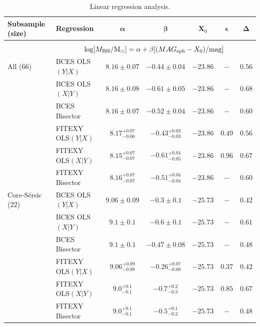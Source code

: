 \documentclass[preprint2]{emulateapj}
\begin{document}
\begin{table}
\centering
\caption{Linear regression analysis.}
\begin{tabular}{llccccc}
\hline
\hline
{\bf Subsample (size)} & {\bf Regression} & $\boldsymbol \alpha$ & $\boldsymbol \beta$ & $\boldsymbol X_0$ & $\boldsymbol \epsilon$ & $\boldsymbol \Delta$ \\ 
\hline 
\\
 & \multicolumn{6}{c}{$\log[M_{\rm BH}/{\rm M_\odot}] = \alpha + \beta[(MAG_{\rm sph} - X_0)/{\rm mag}]$} \\ [0.5em]
All (66)	       & BCES OLS$(Y|X)$   & $8.16 \pm 0.07$ & $-0.44 \pm 0.04$ & $-23.86$ & $-$ & $0.56$ \\
		       & BCES OLS$(X|Y)$   & $8.16 \pm 0.08$ & $-0.61 \pm 0.05$ & $-23.86$ & $-$ & $0.68$ \\
		       & BCES Bisector     & $8.16 \pm 0.07$ & $-0.52 \pm 0.04$ & $-23.86$ & $-$ & $0.60$ \\
		       & FITEXY OLS$(Y|X)$ & $8.17^{+0.07}_{-0.06}$ & $-0.43^{+0.03}_{-0.03}$ & $-23.86$ & $0.49$ & $0.56$ \\
		       & FITEXY OLS$(X|Y)$ & $8.15^{+0.07}_{-0.07}$ & $-0.61^{+0.04}_{-0.05}$ & $-23.86$ & $0.96$ & $0.67$ \\
		       & FITEXY Bisector   & $8.16^{+0.07}_{-0.07}$ & $-0.51^{+0.04}_{-0.04}$ & $-23.86$ & $-$    & $0.60$ \\

Core-S\'ersic (22) & BCES OLS$(Y|X)$   & $9.06 \pm 0.09$ & $-0.3  \pm 0.1$  & $-25.73$ & $-$    & $0.42$ \\ 
                   & BCES OLS$(X|Y)$   & $9.1  \pm 0.1$  & $-0.6  \pm 0.1$  & $-25.73$ & $-$    & $0.61$ \\
                   & BCES Bisector     & $9.1  \pm 0.1$  & $-0.47 \pm 0.08$ & $-25.73$ & $-$    & $0.48$ \\
                   & FITEXY OLS$(Y|X)$ & $9.06^{+0.09}_{-0.08}$ & $-0.26^{+0.07}_{-0.08}$ & $-25.73$ & $0.37$ & $0.42$ \\
                   & FITEXY OLS$(X|Y)$ & $9.0^{+0.1}_{-0.1}$ & $-0.7^{+0.2}_{-0.3}$ & $-25.73$ & $0.85$ & $0.67$ \\
                   & FITEXY Bisector   & $9.0^{+0.1}_{-0.1}$ & $-0.5^{+0.1}_{-0.2}$ & $-25.73$ & $-$    & $0.48$ \\


\end{tabular}
\end{table}
\end{document}
